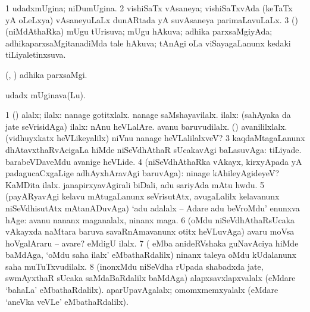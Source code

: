 \bentry
{}
\gl{\gu}
\bmng
\bnum
\num{1} udadxmUgina; niDumUgina. 
\num{2} vishiSaTx vAsaneya; vishiSaTxvAda (keTaTx yA oLeLxya) vAsaneyuLaLx dunARtada yA suvAsaneya parimaLavuLaLx. 
\num{3} (\ashi) (niMdAthaRka) mUgu tUrisuva; mUgu hAkuva; adhika parxsaMgiyAda; adhikaparxsaMgitanadiMda tale hAkuva; tAnAgi oLa viSayagaLanunx kedaki tiLiyaletinxsuva. 
\enum
\emng

\noindent
\gl{\pagu}
\bmng
{}(\birx, \AmA) adhika parxsaMgi. 
\emng
\eentry

\bentry
{}
\gl{\nA}
\bmng
udadx mUginava(Lu). 
\emng
\eentry

\bentry
{}
\gl{\kirxvi}
\bmng
\bnum
\num{1} (\pArxparx) alalx; ilalx:  nanage gotitxlalx.  nanage saMshayavilalx. 
 ilalx: 
\banum
{} (sahAyaka \kirx da jate  seVrisidAga) ilalx:  nAnu heVLalAre.  avanu baruvudilalx. (\ashi)  avanililxlalx. 
 (vidhuyxkatx heVLikeyalilx)  niVnu nanage heVLalilalxveV? 
\eanum
\numie
\num{3} kaqdaMtagaLanunx dhAtavxthaRvAcigaLa hiMde niSeVdhAthaR sUcakavAgi baLasuvAga:  tiLiyade.  barabeVDaveMdu avanige heVLide. 
\num{4} (niSeVdhAthaRka vAkayx, kirxyApada yA padagucaCxgaLige adhAyxhAravAgi baruvAga):  ninage kAhileyAgideyeV? KaMDita ilalx.  janapirxyavAgirali biDali, adu sariyAda mAtu hwdu. 
\num{5} (payARyavAgi kelavu mAtugaLanunx seVrisutAtx, avugaLalilx kelavanunx niSeVdhisutAtx mAtanADuvAga) `adu adalalx -- Adare adu beVroMdu' enunxva hAge:  avanu nananx maganalalx, ninanx maga. 
\num{6} (oMdu niSeVdhAthaRsUcaka vAkayxda naMtara baruva savaRnAmavanunx otitx heVLuvAga)  avaru moVsa hoVgalAraru -- avare? eMdigU ilalx. 
\num{7} ( eMba anideRVshaka guNavAciya hiMde baMdAga, `oMdu saha ilalx' eMbathaRdalilx)  ninanx taleya oMdu kUdalanunx saha muTuTxvudilalx. 
\num{8} (inonxMdu niSeVdha rUpada shabadxda jate, swmAyxthaR sUcaka saMdaBaRdalilx baMdAga)  alapxsavxlapxvalalx (eMdare `bahaLa' eMbathaRdalilx).  aparUpavAgalalx; omomxmemxyalalx (eMdare `aneVka veVLe' eMbathaRdalilx). 
\enum
\emng

